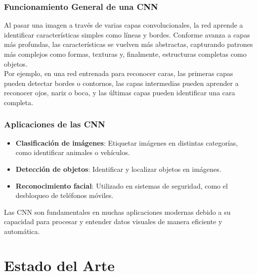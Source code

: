 \subsubsection{Funcionamiento General de una CNN}\label{subsubsec:funcionamiento_general_de_una_cnn}
Al pasar una imagen a través de varias capas convolucionales, la red aprende a identificar características simples como
líneas y bordes.
Conforme avanza a capas más profundas, las características se vuelven más abstractas, capturando patrones más complejos
como formas, texturas y, finalmente, estructuras completas como objetos. \\[2pt]

Por ejemplo, en una red entrenada para reconocer caras, las primeras capas pueden detectar bordes o contornos, las
capas intermedias pueden aprender a reconocer ojos, nariz o boca, y las últimas capas pueden identificar una cara
completa.

\subsubsection{Aplicaciones de las CNN}\label{subsubsec:aplicaciones_de_las_cnn}
\begin{itemize}
    \item \textbf{Clasificación de imágenes}: Etiquetar imágenes en distintas categorías, como identificar animales o
vehículos.
    \item \textbf{Detección de objetos}: Identificar y localizar objetos en imágenes.
    \item \textbf{Reconocimiento facial}: Utilizado en sistemas de seguridad, como el desbloqueo de teléfonos móviles.
\end{itemize}

Las CNN son fundamentales en muchas aplicaciones modernas debido a su capacidad para procesar y entender datos visuales
de manera eficiente y automática.


\section{Estado del Arte}\label{sec:estado_del_arte}
